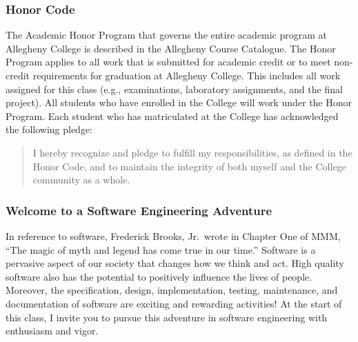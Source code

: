 \subsubsection*{Honor Code}

The Academic Honor Program that governs the entire academic program at Allegheny College is described in the Allegheny
Course Catalogue.  The Honor Program applies to all work that is submitted for academic credit or to meet non-credit
requirements for graduation at Allegheny College.  This includes all work assigned for this class (e.g., examinations,
laboratory assignments, and the final project).  All students who have enrolled in the College will work under the Honor
Program.  Each student who has matriculated at the College has acknowledged the following pledge:

\begin{quote}
I hereby recognize and pledge to fulfill my responsibilities, as defined in the Honor Code, and to maintain the
integrity of both myself and the College community as a whole.  
\end{quote}

\subsubsection*{Welcome to a Software Engineering Adventure}

In reference to software, Frederick Brooks, Jr.\ wrote in Chapter One of MMM, ``The magic of myth and legend has come true
in our time.'' Software is a pervasive aspect of our society that changes how we think and act.  High quality software
also has the potential to positively influence the lives of people. Moreover, the specification, design, implementation,
testing, maintenance, and documentation of software are exciting and rewarding activities!  At the start of this class,
I invite you to pursue this adventure in software engineering with enthusiasm and vigor.


